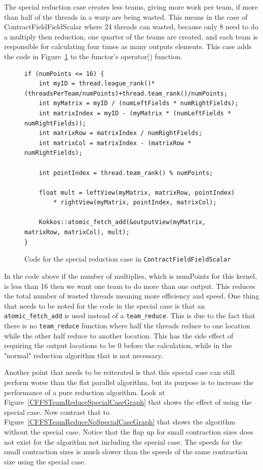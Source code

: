 The special reduction case creates less teams, giving more work per team, if
more than half of the threads in a warp are being wasted. This means in the
case of ContractFieldFieldScalar where 24 threads can wasted, because only 8
need to do a multiply then reduction, one quarter of the teams are created, and
each team is responsible for calculating four times as many outputs elements.
This case adds the code in
Figure~\ref{lst:ContractFieldFieldScalarReductionSpecialCase} to the functor's
operator() function. \\
\begin{figure}[!ht]
    \begin{lstlisting}
if (numPoints <= 16) {	
	int myID = thread.league_rank()*(threadsPerTeam/numPoints)+thread.team_rank()/numPoints;
	int myMatrix = myID / (numLeftFields * numRightFields);
	int matrixIndex = myID - (myMatrix * (numLeftFields * numRightFields));
	int matrixRow = matrixIndex / numRightFields;
	int matrixCol = matrixIndex - (matrixRow * numRightFields);

	int pointIndex = thread.team_rank() % numPoints;

	float mult = leftView(myMatrix, matrixRow, pointIndex) 
		* rightView(myMatrix, pointIndex, matrixCol);

	Kokkos::atomic_fetch_add(&outputView(myMatrix, matrixRow, matrixCol), mult);
}
    \end{lstlisting}
\caption{Code for the special reduction case in \texttt{ContractFieldFieldScalar}
\label{lst:ContractFieldFieldScalarReductionSpecialCase}} 
\end{figure}

In the code above if the number of multiplies, which is numPoints for this
kernel, is less than 16 then we want one team to do more than one output. This
reduces the total number of wasted threads meaning more efficiency and speed.
One thing that needs to be noted for the code in the special case is that an
\texttt{atomic\_fetch\_add} is used instead of a \texttt{team\_reduce}. This is due to the fact
that there is no \texttt{team\_reduce} function where half the threads reduce to one
location while the other half reduce to another location. This has the side
effect of requiring the output locations to be 0 before the calculation, while
in the "normal" reduction algorithm that is not necessary. 

Another point that needs to be reiterated is that this special case can still
perform worse than the flat parallel algorithm, but its purpose is to increase
the performance of a pure reduction algorithm. Look at
Figure~\ref{CFFSTeamReduceSpecialCaseGraph} that shows the effect of using the
special case. Now contrast that to
Figure~\ref{CFFSTeamReduceNoSpecialCaseGraph} that shows the algorithm without
the special case. Notice that the flap up for small contraction sizes does not
exist for the algorithm not including the special case. The speeds for the
small contraction sizes is much slower than the speeds of the same contraction
size using the special case.

